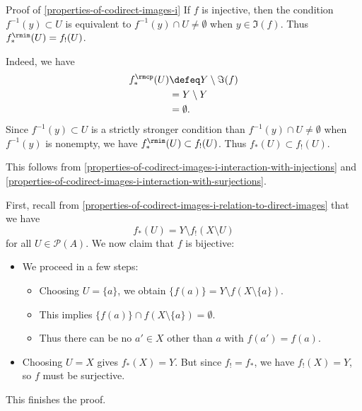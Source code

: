 \begin{Proof}{Proof of \cref{properties-of-codirect-images-i}}
    If $f$ is injective, then the condition $f^{-1}(y)\subset U$ is equivalent to $f^{-1}(y)\cap U\neq\emptyset$ when $y\in\Im(f)$. Thus $f^{\rmim}_{*}(U)=f_{!}(U)$.

    Indeed, we have
    \begin{align*}
        f^{\rmcp}_{*}(U) &\defeq Y\setminus\Im(f)\\%
                         &=      Y\setminus Y\\
                         &=      \emptyset.
    \end{align*}
    Since $f^{-1}(y)\subset U$ is a strictly stronger condition than $f^{-1}(y)\cap U\neq\emptyset$ when $f^{-1}(y)$ is nonempty, we have $f^{\rmim}_{*}(U)\subset f_{!}(U)$. Thus $f_{*}(U)\subset f_{!}(U)$.

    This follows from \cref{properties-of-codirect-images-i-interaction-with-injections} and \cref{properties-of-codirect-images-i-interaction-with-surjections}.

    First, recall from \cref{properties-of-codirect-images-i-relation-to-direct-images} that we have
    \[
        f_{*}(U)%
        =%
        Y\setminus f_{!}(X\setminus U)%
    \]%
    for all $U\in\mathcal{P}(A)$. We now claim that $f$ is bijective:
    \begin{itemize}
        \item{}We proceed in a few steps:
            \begin{itemize}
                \item Choosing $U=\{a\}$, we obtain $\{f(a)\}=Y\setminus f(X\setminus\{a\})$.
                \item This implies $\{f(a)\}\cap f(X\setminus\{a\})=\emptyset$.
                \item Thus there can be no $a'\in X$ other than $a$ with $f(a')=f(a)$.
            \end{itemize}
        \item{}Choosing $U=X$ gives $f_{*}(X)=Y$. But since $f_{!}=f_{*}$, we have $f_{!}(X)=Y$, so $f$ must be surjective.
    \end{itemize}
    This finishes the proof.
\end{Proof}
